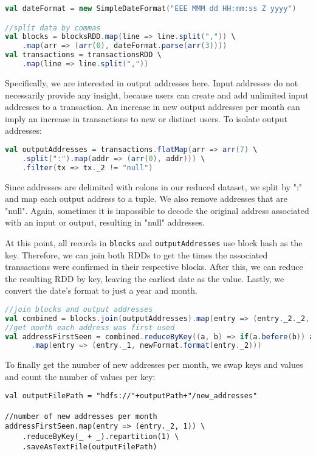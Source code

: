\documentclass[9pt,twocolumn,twoside]{idsi}
\begin{document}
\begin{lstlisting}[language=Scala]
val dateFormat = new SimpleDateFormat("EEE MMM dd HH:mm:ss Z yyyy")

//split data by commas
val blocks = blocksRDD.map(line => line.split(",")) \
    .map(arr => (arr(0), dateFormat.parse(arr(3))))
val transactions = transactionsRDD \
    .map(line => line.split(","))
\end{lstlisting}

Specifically, we are interested in output addresses here. Input addresses do not necessarily provide any insight, because users can create and add unlimited input addresses to a transaction. An increase in new output addresses per month can imply an increase in transactions to new or distinct users. To isolate output addresses:

\begin{lstlisting}[language=Scala]
val outputAddresses = transactions.flatMap(arr => arr(7) \
    .split(":").map(addr => (arr(0), addr))) \
    .filter(tx => tx._2 != "null")
\end{lstlisting}

Since addresses are delimited with colons in our reduced dataset, we split by ":" and map each output address to a tuple. We also remove addresses that are "null". Again, sometimes it is impossible to decode the original address associated with an input or output, resulting in "null" addresses.

At this point, all records in \lstinline{blocks} and \lstinline{outputAddresses} use block hash as the key. Therefore, we can join both RDDs to get the times the associated transactions were confirmed in their respective blocks. After this, we can reduce the resulting RDD by key, leaving the earliest date as the value. Lastly, we convert the date's format to just a year and month.

\begin{lstlisting}[language=Scala]
//join blocks and output addresses
val combined = blocks.join(outputAddresses).map(entry => (entry._2._2, entry._2._1))
//get month each address was first used
val addressFirstSeen = combined.reduceByKey((a, b) => if(a.before(b)) a else b) \
      .map(entry => (entry._1, newFormat.format(entry._2)))
\end{lstlisting}

To finally get the number of new addresses per month, we swap keys and values and count the number of values per key:

\begin{lstlisting}
val outputFilePath = "hdfs://"+outputPath+"/new_addresses"

//number of new addresses per month
addressFirstSeen.map(entry => (entry._2, 1)) \
    .reduceByKey(_ + _).repartition(1) \
    .saveAsTextFile(outputFilePath)
\end{lstlisting}
\end{document}
